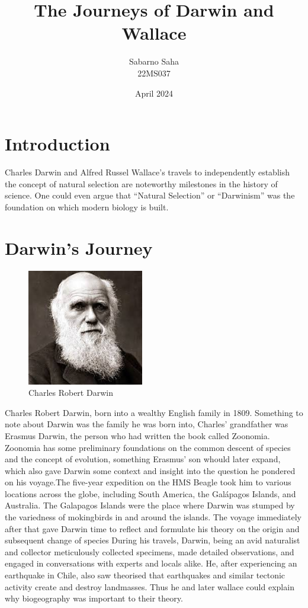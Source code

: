 \documentclass{article}
\title{\huge  The Journeys of Darwin and Wallace}
\author{Sabarno Saha \\ 22MS037}
\date{April 2024}
\begin{document}
\maketitle

\section{Introduction}
\par
Charles Darwin and Alfred Russel Wallace's travels to independently establish the concept of natural selection are noteworthy milestones in the history of science. One could even argue that “Natural Selection” or “Darwinism” was the foundation on which modern biology is built. 
\section{Darwin's Journey}
\begin{figure}[h]
    \centering
    \includegraphics[width = 2.0in]{darwin.jpg}
    \caption{Charles Robert Darwin}
    \label{fig:enter-label}
\end{figure}
\par  Charles Robert Darwin, born into a wealthy English family in 1809. Something to note about Darwin was the family he was born into, Charles’ grandfather was Erasmus Darwin, the person who had written the book called Zoonomia. Zoonomia has some preliminary foundations on the common descent of species and the concept of evolution, something Erasmus’ son whould later expand, which  also gave Darwin some context and insight into the question he pondered on his voyage.The five-year expedition  on the HMS Beagle took him to various locations across the globe, including South America, the Galápagos Islands, and Australia. The Galapagos Islands were the place where Darwin was stumped by the variedness of mokingbirds in and around the islands. The voyage immediately after that gave Darwin time to reflect and formulate his theory on the origin and subsequent change of species During his travels, Darwin, being an avid naturalist and collector meticulously collected specimens, made detailed observations, and engaged in conversations with experts and locals alike. He, after experiencing an earthquake in Chile, also saw theorised that earthquakes and similar tectonic activity create and destroy landmasses. Thus he and later wallace could explain why biogeography was important to their theory.  \\ 
\end{document}
